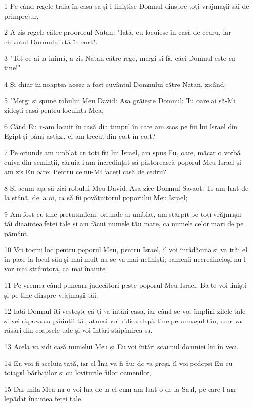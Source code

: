 \par 1 Pe când regele trăia în casa sa și-l liniștise Domnul dinspre toți vrăjmașii săi de primprejur,
\par 2 A zis regele către proorocul Natan: "Iată, eu locuiesc în casă de cedru, iar chivotul Domnului stă în cort".
\par 3 "Tot ce ai la inimă, a zis Natan către rege, mergi și fă, căci Domnul este cu tine!"
\par 4 Și chiar în noaptea aceea a fost cuvântul Domnului către Natan, zicând:
\par 5 "Mergi și spune robului Meu David: Așa grăiește Domnul: Tu oare ai să-Mi zidești casă pentru locuința Mea,
\par 6 Când Eu n-am locuit în casă din timpul în care am scos pe fiii lui Israel din Egipt și până astăzi, ci am trecut din cort în cort?
\par 7 Pe oriunde am umblat cu toți fiii lui Israel, am spus Eu, oare, măcar o vorbă cuiva din seminții, căruia i-am încredințat să păstorească poporul Meu Israel și am zis Eu oare: Pentru ce nu-Mi faceți casă de cedru?
\par 8 Și acum așa să zici robului Meu David: Așa zice Domnul Savaot: Te-am luat de la stână, de la oi, ca să fii povățuitorul poporului Meu Israel;
\par 9 Am fost cu tine pretutindeni; oriunde ai umblat, am stârpit pe toți vrăjmașii tăi dinaintea feței tale și am făcut numele tău mare, ca numele celor mari de pe pământ.
\par 10 Voi tocmi loc pentru poporul Meu, pentru Israel, îl voi înrădăcina și va trăi el în pace la locul său și mai mult nu se va mai neliniști; oamenii necredincioși nu-l vor mai strâmtora, ca mai înainte,
\par 11 Pe vremea când puneam judecători peste poporul Meu Israel. Ba te voi liniști și pe tine dinspre vrăjmașii tăi.
\par 12 Iată Domnul îți vestește că-ți va întări casa, iar când se vor împlini zilele tale și vei răposa cu părinții tăi, atunci voi ridica după tine pe urmașul tău, care va răsări din coapsele tale și voi întări stăpânirea sa.
\par 13 Acela va zidi casă numelui Meu și Eu voi întări scaunul domniei lui în veci.
\par 14 Eu voi fi aceluia tată, iar el Îmi va fi fiu; de va greși, îl voi pedepsi Eu cu toiagul bărbaților și cu loviturile fiilor oamenilor,
\par 15 Dar mila Mea nu o voi lua de la el cum am luat-o de la Saul, pe care l-am lepădat înaintea feței tale.
